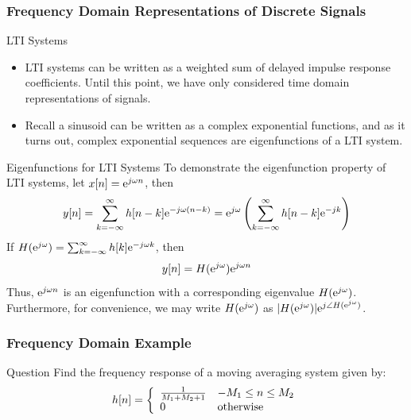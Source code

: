 \documentclass[mathserif,9pt,handout]{beamer}
\begin{document}
\begin{frame}\frametitle{Frequency Domain Representations of Discrete Signals}\small
  \begin{block}{LTI Systems}
    \begin{itemize}
      \item LTI systems can be written as a weighted sum of delayed impulse response coefficients. Until this point, we have only considered time domain representations of signals.   
      \item Recall a sinusoid can be written as a complex exponential functions, and as it turns out, complex exponential sequences are eigenfunctions of a LTI system. 
    \end{itemize}
  \end{block}
  
  \begin{exampleblock}{Eigenfunctions for LTI Systems}
    To demonstrate the eigenfunction property of LTI systems, let $x[n] = {\textrm{e}}^{j\omega n}$, then 
    \begin{align}
      y[n] = \sum_{k=-\infty}^{\infty}h[n-k] {\textrm{e}}^{-j\omega(n-k)} = {\textrm{e}}^{j\omega} \left(\sum_{k=-\infty}^{\infty}h[n-k] {\textrm{e}}^{-jk}\right) \nonumber
    \end{align}
    If $H({\textrm{e}}^{j\omega}) = \sum_{k=-\infty}^{\infty}{h[k]{\textrm{e}}^{-j\omega k}}$, then 
    \begin{align}
      y[n]  = H({\textrm{e}}^{j\omega}){\textrm{e}}^{j\omega n} \nonumber
    \end{align}
    Thus, ${\textrm{e}}^{j\omega n}$ is an eigenfunction with a corresponding eigenvalue $H({\textrm{e}}^{j\omega})$. Furthermore, for convenience, we may write $H({\textrm{e}}^{j\omega})$ as $|H({\textrm{e}}^{j\omega})| {\textrm{e}}^{j\angle H({\textrm{e}}^{j\omega})}$.
  \end{exampleblock}
\end{frame}

\begin{frame}\frametitle{Frequency Domain Example}
   
   \begin{block}{Question}
   Find the frequency response of a moving averaging system  given by: 
   \begin{align}
     h[n] = \left\{
       \begin{array}{l l}
         \frac{1}{M_1+M_2+1} & -M_1 \leq n \leq M_2 \\
         0 & \textrm{otherwise}
       \end{array}
     \right. \nonumber
   \end{align}
   \end{block}
\end{frame}
\end{document}
